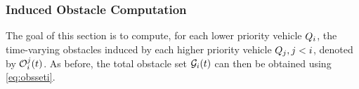 %

\subsubsection{Induced Obstacle Computation \label{sec:intruder_iocomp}}
The goal of this section is to compute, for each lower priority vehicle $Q_i$, the time-varying obstacles induced by each higher priority vehicle $Q_j, j < i$, denoted by $\mathcal{O}_i^j(t)$. As before, the total obstacle set $\mathcal{G}_i(t)$ can then be obtained using \eqref{eq:obsseti}. 

